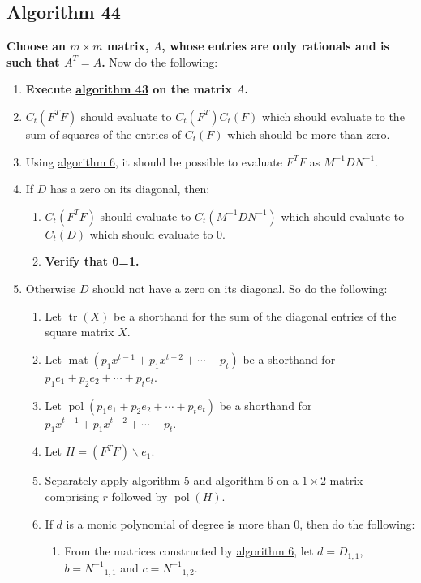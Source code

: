 \documentclass[twocolumn]{article}
\DeclareMathOperator{\mat}{mat}
\DeclareMathOperator{\pol}{pol}
\DeclareMathOperator{\tr}{tr}
\begin{document}
		\subsection{Algorithm 44}\label{sec:algorithm 44}
			\textbf{Choose an $m\times m$ matrix, $A$, whose entries are only rationals and is such that $A^T=A$.} Now do the following:
			\begin{enumerate}
				\item \textbf{Execute \hyperref[sec:algorithm 43]{algorithm 43} on the matrix $A$.}
				\item $C_t(F^TF)$ should evaluate to $C_t(F^T)C_t(F)$ which should evaluate to the sum of squares of the entries of $C_t(F)$ which should be more than zero.
				\item Using \hyperref[sec:algorithm 6]{algorithm 6}, it should be possible to evaluate $F^TF$ as $M^{-1}DN^{-1}$.
				\item If $D$ has a zero on its diagonal, then:
				\begin{enumerate}
					\item $C_t(F^TF)$ should evaluate to $C_t(M^{-1}DN^{-1})$ which should evaluate to $C_t(D)$ which should evaluate to $0$.
					\item \textbf{Verify that 0=1.}
				\end{enumerate}
				\item Otherwise $D$ should not have a zero on its diagonal. So do the following:
				\begin{enumerate}
					\item Let $\tr(X)$ be a shorthand for the sum of the diagonal entries of the square matrix $X$.
					\item Let $\mat(p_1x^{t-1}+p_1x^{t-2}+\cdots+p_t)$ be a shorthand for $p_1e_1+p_2e_2+\cdots+p_te_t$.
					\item Let $\pol(p_1e_1+p_2e_2+\cdots+p_te_t)$ be a shorthand for $p_1x^{t-1}+p_1x^{t-2}+\cdots+p_t$.
					\item Let $H=(F^TF)\backslash e_1$.
					\item Separately apply \hyperref[sec:algorithm 5]{algorithm 5} and \hyperref[sec:algorithm 6]{algorithm 6} on a $1\times 2$ matrix comprising $r$ followed by $\pol(H)$.
					\item If $d$ is a monic polynomial of degree is more than $0$, then do the following:
					\begin{enumerate}
						\item From the matrices constructed by \hyperref[sec:algorithm 6]{algorithm 6}, let $d=D_{1,1}$, $b={N^{-1}}_{1,1}$ and $c={N^{-1}}_{1,2}$.

\end{enumerate}
\end{enumerate}
\end{enumerate}
\end{document}
